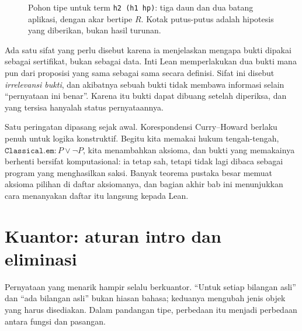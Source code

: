 \begin{figure}[htbp]
\centering
{}
\caption{Pohon tipe untuk term \texttt{h2 (h1 hp)}: tiga daun dan dua batang aplikasi, dengan akar
bertipe $R$. Kotak putus-putus adalah hipotesis yang diberikan, bukan hasil turunan.}
\label{fig:pohon-tipe}
\end{figure}

Ada satu sifat yang perlu disebut karena ia menjelaskan mengapa bukti dipakai sebagai sertifikat,
bukan sebagai data. Inti Lean memperlakukan dua bukti mana pun dari proposisi yang sama sebagai
sama secara definisi. Sifat ini disebut \emph{irrelevansi bukti}, dan akibatnya sebuah bukti tidak
membawa informasi selain ``pernyataan ini benar''. Karena itu bukti dapat dibuang setelah
diperiksa, dan yang tersisa hanyalah status pernyataannya.

Satu peringatan dipasang sejak awal. Korespondensi Curry--Howard berlaku penuh untuk logika
konstruktif. Begitu kita memakai hukum tengah-tengah, $\mathtt{Classical.em}:P\vee\neg P$, kita
menambahkan aksioma, dan bukti yang memakainya berhenti bersifat komputasional: ia tetap sah,
tetapi tidak lagi dibaca sebagai program yang menghasilkan saksi. Banyak teorema pustaka besar
memuat aksioma pilihan di daftar aksiomanya, dan bagian akhir bab ini menunjukkan cara menanyakan
daftar itu langsung kepada Lean.

\section{Kuantor: aturan intro dan eliminasi}


Pernyataan yang menarik hampir selalu berkuantor. ``Untuk setiap bilangan asli'' dan ``ada
bilangan asli'' bukan hiasan bahasa; keduanya mengubah jenis objek yang harus disediakan. Dalam
pandangan tipe, perbedaan itu menjadi perbedaan antara fungsi dan pasangan.

